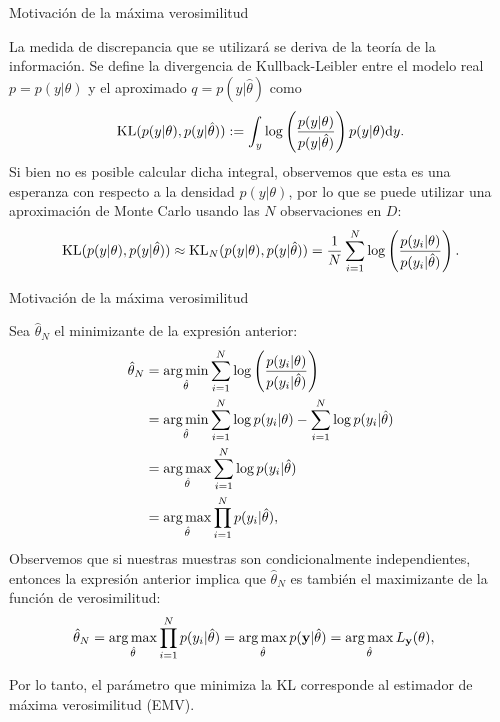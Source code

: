 \documentclass[9pt]{beamer}
\begin{document}
\begin{frame}{Motivación de la máxima verosimilitud}

La medida de discrepancia que se utilizará se deriva de la teoría de la información. Se define la divergencia de Kullback-Leibler entre el modelo real $p =  p(y|\theta)$ y el aproximado $q  = p(y|\hat\theta)$ como
\begin{equation*}
 	\operatorname{\text{KL}}( p(y|\theta),p(y|\hat\theta)) :=  \int_y\log\left(\frac{p(y|\theta)}{p(y|\hat\theta)}\right)p(y|\theta){\text d} y.\label{eq:KL_maxlike}
 \end{equation*} \pause
Si bien no es posible calcular dicha integral, observemos que esta es una esperanza con respecto a la densidad $p(y|\theta)$, por lo que se puede utilizar una aproximación de Monte Carlo usando las $N$ observaciones en $D$:
\begin{equation*}
	\operatorname{\text{KL}}( p(y|\theta),p(y|\hat\theta)) 	\approx \operatorname{\text{KL}}_N( p(y|\theta),p(y|\hat\theta)) = \frac{1}{N}\sum_{i=1}^N\log\left(\frac{p(y_i|\theta)}{p(y_i|\hat\theta)}\right).
\end{equation*}
	
\end{frame}

\begin{frame}{Motivación de la máxima verosimilitud}

Sea $\hat\theta_N$ el minimizante de la  expresión anterior:
 \begin{align*}
 	\hat\theta_N & =  \operatorname*{arg\,min}_{\hat\theta}  \sum_{i=1}^N\log\left(\frac{p(y_i|\theta)}{p(y_i|\hat\theta)}\right)\\
 				&= \operatorname*{arg\,min}_{\hat\theta}  \sum_{i=1}^N  \log p(y_i|\theta) - \sum_{i=1}^N \log p(y_i|\hat\theta)\nonumber\\
 				&= \operatorname*{arg\,max}_{\hat\theta}  \sum_{i=1}^N \log p(y_i|\hat\theta)\nonumber\\
 				&= \operatorname*{arg\,max}_{\hat\theta}  \prod_{i=1}^N p(y_i|\hat\theta),\nonumber
 \end{align*}\pause
Observemos que si nuestras muestras son condicionalmente independientes, entonces la expresión anterior implica que $\hat\theta_N$ es también el maximizante de la función de verosimilitud:
 \begin{align*}
 	\hat\theta_N &= \operatorname*{arg\,max}_{\hat\theta}  \prod_{i=1}^N p(y_i|\hat\theta) = \operatorname*{arg\,max}_{\hat\theta}  p(\mathbf{y}|\hat\theta) = \operatorname*{arg\,max}_{\hat\theta}  L_{\mathbf{y}}(\theta),
 \end{align*}
 
 Por lo tanto, el parámetro que minimiza la KL corresponde al estimador de máxima verosimilitud (EMV).
	
\end{frame}
\end{document}

